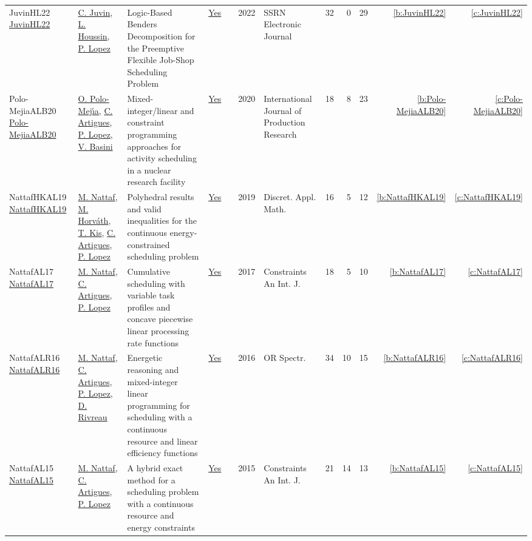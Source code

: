 {\begin{longtable}{>{\raggedright\arraybackslash}p{3cm}>{\raggedright\arraybackslash}p{6cm}>{\raggedright\arraybackslash}p{6.5cm}rrrp{2.5cm}rrrrr}
JuvinHL22 \href{http://dx.doi.org/10.2139/ssrn.4068164}{JuvinHL22} & \hyperref[auth:a0]{C. Juvin}, \hyperref[auth:a2]{L. Houssin}, \hyperref[auth:a3]{P. Lopez} & Logic-Based Benders Decomposition for the Preemptive Flexible Job-Shop Scheduling Problem & \href{../works/JuvinHL22.pdf}{Yes} & \cite{JuvinHL22} & 2022 & SSRN Electronic Journal & 32 & 0 & 29 & \ref{b:JuvinHL22} & \ref{c:JuvinHL22}\\
Polo-MejiaALB20 \href{https://doi.org/10.1080/00207543.2019.1693654}{Polo-MejiaALB20} & \hyperref[auth:a524]{O. Polo{-}Mej{\'{\i}}a}, \hyperref[auth:a6]{C. Artigues}, \hyperref[auth:a3]{P. Lopez}, \hyperref[auth:a525]{V. Basini} & Mixed-integer/linear and constraint programming approaches for activity scheduling in a nuclear research facility & \href{../works/Polo-MejiaALB20.pdf}{Yes} & \cite{Polo-MejiaALB20} & 2020 & International Journal of Production Research & 18 & 8 & 23 & \ref{b:Polo-MejiaALB20} & \ref{c:Polo-MejiaALB20}\\
NattafHKAL19 \href{https://doi.org/10.1016/j.dam.2018.11.008}{NattafHKAL19} & \hyperref[auth:a81]{M. Nattaf}, \hyperref[auth:a1023]{M. Horv{\'{a}}th}, \hyperref[auth:a157]{T. Kis}, \hyperref[auth:a6]{C. Artigues}, \hyperref[auth:a3]{P. Lopez} & Polyhedral results and valid inequalities for the continuous energy-constrained scheduling problem & \href{../works/NattafHKAL19.pdf}{Yes} & \cite{NattafHKAL19} & 2019 & Discret. Appl. Math. & 16 & 5 & 12 & \ref{b:NattafHKAL19} & \ref{c:NattafHKAL19}\\
NattafAL17 \href{https://doi.org/10.1007/s10601-017-9271-4}{NattafAL17} & \hyperref[auth:a81]{M. Nattaf}, \hyperref[auth:a6]{C. Artigues}, \hyperref[auth:a3]{P. Lopez} & Cumulative scheduling with variable task profiles and concave piecewise linear processing rate functions & \href{../works/NattafAL17.pdf}{Yes} & \cite{NattafAL17} & 2017 & Constraints An Int. J. & 18 & 5 & 10 & \ref{b:NattafAL17} & \ref{c:NattafAL17}\\
NattafALR16 \href{https://doi.org/10.1007/s00291-015-0423-x}{NattafALR16} & \hyperref[auth:a81]{M. Nattaf}, \hyperref[auth:a6]{C. Artigues}, \hyperref[auth:a3]{P. Lopez}, \hyperref[auth:a1003]{D. Rivreau} & Energetic reasoning and mixed-integer linear programming for scheduling with a continuous resource and linear efficiency functions & \href{../works/NattafALR16.pdf}{Yes} & \cite{NattafALR16} & 2016 & {OR} Spectr. & 34 & 10 & 15 & \ref{b:NattafALR16} & \ref{c:NattafALR16}\\
NattafAL15 \href{https://doi.org/10.1007/s10601-015-9192-z}{NattafAL15} & \hyperref[auth:a81]{M. Nattaf}, \hyperref[auth:a6]{C. Artigues}, \hyperref[auth:a3]{P. Lopez} & A hybrid exact method for a scheduling problem with a continuous resource and energy constraints & \href{../works/NattafAL15.pdf}{Yes} & \cite{NattafAL15} & 2015 & Constraints An Int. J. & 21 & 14 & 13 & \ref{b:NattafAL15} & \ref{c:NattafAL15}\\

\end{longtable}}
